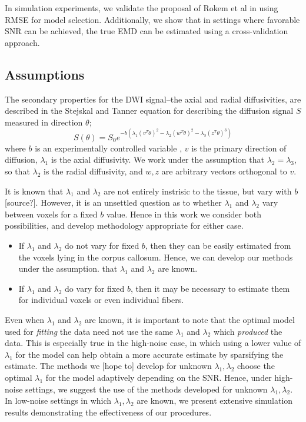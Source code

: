 \documentclass[11pt]{article}
\begin{document}
In simulation experiments, we validate the proposal of Rokem et al
\cite{Rokem2013} in using RMSE for model selection.
Additionally, we show that in settings where favorable SNR can be
achieved, the true EMD can be estimated using a cross-validation approach.

\subsection{Assumptions}

The secondary properties for the DWI signal--the axial and radial
diffusivities, are described in the Stejskal and Tanner equation\cite{Stejskal1965} for
describing the diffusion signal $S$ measured in direction $\theta$;
\[
S(\theta) = S_0 e^{-b(\lambda_1(v^T \theta)^2 - \lambda_2(w^T
  \theta)^2 - \lambda_3(z^T \theta)^3)}
\]
where $b$ is an experimentally controlled variable
\cite{Matiello1997},
$v$ is the primary direction of diffusion, $\lambda_1$ is the axial
diffusivity.
We work under the assumption that $\lambda_2=\lambda_3$,
so that $\lambda_2$ is the radial diffusivity, and $w,z$ are arbitrary
vectors orthogonal to $v$.

It is known that $\lambda_1$ and $\lambda_2$ are not entirely
instrisic to the tissue, but vary with $b$ [source?].
However, it is an unsettled question as to whether $\lambda_1$ and
$\lambda_2$ vary between voxels for a fixed $b$ value.
Hence in this work we consider both possibilities, and develop
methodology appropriate for either case.
\begin{itemize}
\item If $\lambda_1$ and $\lambda_2$ do not vary for fixed $b$, then
  they can be easily estimated from the voxels lying in the corpus
  callosum.  Hence, we can develop our methods under the assumption.
  that $\lambda_1$ and $\lambda_2$ are known.
\item If $\lambda_1$ and $\lambda_2$ do vary for fixed $b$, then it
  may be necessary to estimate them for individual voxels or even
  individual fibers.
\end{itemize}

Even when $\lambda_1$ and $\lambda_2$ are known, it is important to
note that the optimal model used for \emph{fitting} the data need not
use the same $\lambda_1$ and $\lambda_2$ which \emph{produced} the
data.
This is especially true in the high-noise case, in which using a lower
value of $\lambda_1$ for the model can help obtain a more accurate
estimate by sparsifying the estimate.
The methods we [hope to] develop for unknown $\lambda_1,\lambda_2$ choose the
optimal $\lambda_1$ for the model adaptively depending on the SNR.
Hence, under high-noise settings, we suggest the use of the methods
developed for unknown $\lambda_1,\lambda_2$.
In low-noise settings in which $\lambda_1,\lambda_2$ are known, we
present extensive simulation results demonstrating the effectiveness
of our procedures.
\end{document}
